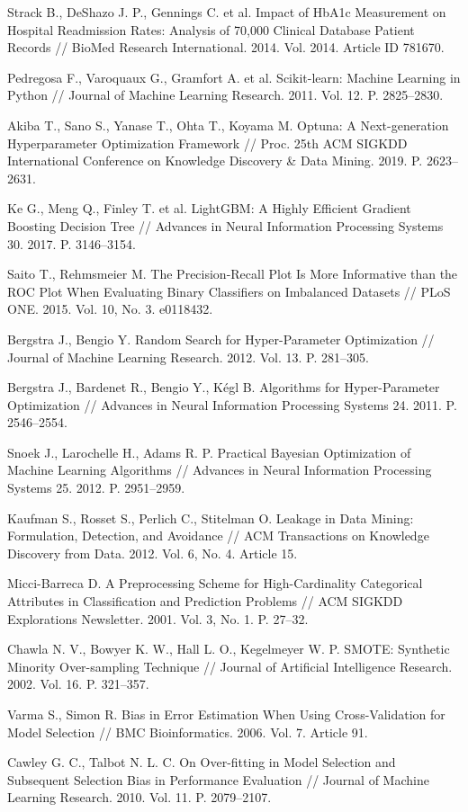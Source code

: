 \documentclass[14pt,a4paper]{extreport}
\begin{document}
\begin{enumerate}[label={[\arabic*]},ref={\arabic*},leftmargin=*,labelindent=0pt]
\item \label{ref:strack} Strack B., DeShazo J. P., Gennings C. et al. Impact of HbA1c Measurement on Hospital Readmission Rates: Analysis of 70,000 Clinical Database Patient Records // BioMed Research International. 2014. Vol. 2014. Article ID 781670.
\item \label{ref:sklearn} Pedregosa F., Varoquaux G., Gramfort A. et al. Scikit-learn: Machine Learning in Python // Journal of Machine Learning Research. 2011. Vol. 12. P. 2825--2830.
\item \label{ref:optuna} Akiba T., Sano S., Yanase T., Ohta T., Koyama M. Optuna: A Next-generation Hyperparameter Optimization Framework // Proc. 25th ACM SIGKDD International Conference on Knowledge Discovery \& Data Mining. 2019. P. 2623--2631.
\item \label{ref:lightgbm} Ke G., Meng Q., Finley T. et al. LightGBM: A Highly Efficient Gradient Boosting Decision Tree // Advances in Neural Information Processing Systems 30. 2017. P. 3146--3154.
\item \label{ref:saito} Saito T., Rehmsmeier M. The Precision-Recall Plot Is More Informative than the ROC Plot When Evaluating Binary Classifiers on Imbalanced Datasets // PLoS ONE. 2015. Vol. 10, No. 3. e0118432.
\item \label{ref:bergstra} Bergstra J., Bengio Y. Random Search for Hyper-Parameter Optimization // Journal of Machine Learning Research. 2012. Vol. 13. P. 281--305.
\item \label{ref:tpe} Bergstra J., Bardenet R., Bengio Y., Kégl B. Algorithms for Hyper-Parameter Optimization // Advances in Neural Information Processing Systems 24. 2011. P. 2546--2554.
\item \label{ref:snoek} Snoek J., Larochelle H., Adams R. P. Practical Bayesian Optimization of Machine Learning Algorithms // Advances in Neural Information Processing Systems 25. 2012. P. 2951--2959.
\item \label{ref:kaufman} Kaufman S., Rosset S., Perlich C., Stitelman O. Leakage in Data Mining: Formulation, Detection, and Avoidance // ACM Transactions on Knowledge Discovery from Data. 2012. Vol. 6, No. 4. Article 15.
\item \label{ref:target} Micci-Barreca D. A Preprocessing Scheme for High-Cardinality Categorical Attributes in Classification and Prediction Problems // ACM SIGKDD Explorations Newsletter. 2001. Vol. 3, No. 1. P. 27--32.
\item \label{ref:smote} Chawla N. V., Bowyer K. W., Hall L. O., Kegelmeyer W. P. SMOTE: Synthetic Minority Over-sampling Technique // Journal of Artificial Intelligence Research. 2002. Vol. 16. P. 321--357.
\item \label{ref:varma} Varma S., Simon R. Bias in Error Estimation When Using Cross-Validation for Model Selection // BMC Bioinformatics. 2006. Vol. 7. Article 91.
\item \label{ref:cawley} Cawley G. C., Talbot N. L. C. On Over-fitting in Model Selection and Subsequent Selection Bias in Performance Evaluation // Journal of Machine Learning Research. 2010. Vol. 11. P. 2079--2107.
\end{enumerate}
\end{document}
